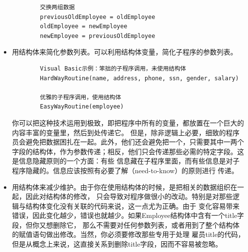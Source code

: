 \documentclass{article}
\begin{document}
\begin{itemize}
\begin{lstlisting}
        交换两组数据
        previousOldEmployee = oldEmployee
        oldEmployee = newEmployee
        newEmployee = previousOldEmployee
    \end{lstlisting}
    \item 用结构体来简化参数列表。可以利用结构体变量，简化子程序的参数列表。
    \begin{lstlisting}
        Visual Basic示例：笨拙的子程序调用，未使用结构体
        HardWayRoutine(name, address, phone, ssn, gender, salary)

        优雅的子程序调用，使用结构体
        EasyWayRoutine(employee)
    \end{lstlisting}
    你可以把这种技术运用到极致，即把程序中所有的变量，都放置在一个巨大的内容丰富的变量里，然后到处传递它。
    但是，除非逻辑上必要，细致的程序员会避免把数据困扎在一起。此外，他们还会避免把一个，只需要其中一两个
    字段的结构体，作为参数传递；相反，他们只会传递那些必需的特定字段。这是信息隐藏原则的一个方面：有些
    信息藏在子程序里面，而有些信息是对子程序隐藏的。信息应该按照有必要了解（need-to-know）的原则进行
    传递。
    \item 用结构体来减少维护。由于你在使用结构体的时候，是把相关的数据组织在一起，因此对结构体的修改，
    只会导致对程序做很小的改动。特别是对那些逻辑与结构体变化没有关联的代码来说，这一点尤为正确。由于
    变化容易带来错误，因此变化越少，错误也就越少。如果Employee结构体中含有一个title字段，但你又想删除它，
    那么不需要对任何参数列表，或者用到了整个结构体的赋值语句做出修改。当然，你必须要修改那些专用于处理
    雇员title的代码，但是从概念上来说，这直接关系到删除title字段，因而不容易被忽略。
\end{itemize}
\end{document}
